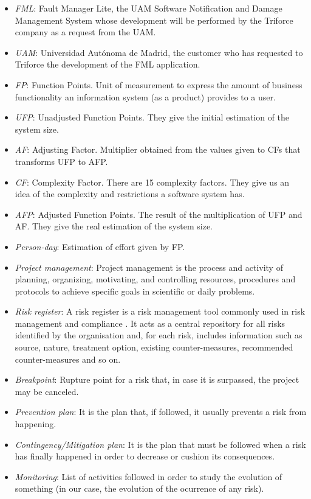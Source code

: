 \documentclass[11pt]{report}
\newcounter{risks}[subsection]
\begin{document}
\begin{itemize}
\item \emph{FML}: Fault Manager Lite, the UAM Software Notification and Damage Management System whose development will be performed by the Triforce company as a request from the UAM.

\item \emph{UAM}: Universidad Autónoma de Madrid, the customer who has requested to Triforce the development of the FML application.

\item \emph{FP}: Function Points. Unit of measurement to express the amount of business functionality an information system (as a product) provides to a user.

\item \emph{UFP}: Unadjusted Function Points. They give the initial estimation of the system size.

\item \emph{AF}: Adjusting Factor. Multiplier obtained from the values given to CFs that transforms UFP to AFP.

\item \emph{CF}: Complexity Factor. There are 15 complexity factors. They give us an idea of the complexity and restrictions a software system has.

\item \emph{AFP}: Adjusted Function Points. The result of the multiplication of UFP and AF. They give the real estimation of the system size.

\item \emph{Person-day}: Estimation of effort given by FP.

\item \emph{Project management}: Project management is the process and activity of planning, organizing, motivating, and controlling resources, procedures and protocols to achieve specific goals in scientific or daily problems.

\item \emph{Risk register}: A risk register is a risk management tool commonly used in risk management and compliance . It acts as a central repository for all risks identified by the organisation and, for each risk, includes information such as source, nature, treatment option, existing counter-measures, recommended counter-measures and so on.

\item \emph{Breakpoint}: Rupture point for a risk that, in case it is surpassed, the project may be canceled.

\item \emph{Prevention plan}: It is the plan that, if followed, it usually prevents a risk from happening.

\item \emph{Contingency/Mitigation plan}: It is the plan that must be followed when a risk has finally happened in order to decrease or cushion its consequences.

\item \emph{Monitoring}: List of activities followed in order to study the evolution of something (in our case, the evolution of the ocurrence of any risk).
\end{itemize}
\end{document}
